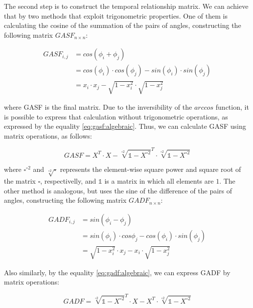 

The second step is to construct the temporal relationship matrix. We can achieve that by two methods that exploit trigonometric properties. One of them is calculating the cosine of the summation of the pairs of angles, constructing the following matrix $GASF_{n \times n}$:

\begin{align}
	GASF_{i,j} 	& = cos(\phi_i + \phi_j) \\
			& = cos(\phi_i) \cdot cos(\phi_j) - sin(\phi_i) \cdot sin(\phi_j) \\
			& = x_i \cdot x_j - \sqrt{1 - x_i^2} \cdot \sqrt{1 - x_j^2} \label{eq:gasf:algebraic}
\end{align}

\noindent where \gls{GASF} is the final matrix. Due to the inversibility of the $arccos$ function, it is possible to express that calculation without trigonometric operations, as expressed by the equality \ref{eq:gasf:algebraic}. Thus, we can calculate \gls{GASF} using matrix operations, as follows:  

\begin{equation}
	GASF = X^T \cdot X - \sqrt[\circ 2]{\mathds{1}-X^{\circ 2}}^T \cdot \sqrt[\circ 2]{\mathds{1}-X^{\circ 2}}
\end{equation}

\noindent where $\square^{\circ 2}$ and $\sqrt[\circ 2]{\square}$ represents the element-wise square power and square root of the matrix $\square$, respectivelly, and $\mathds{1}$ is a matrix in which all elements are $1$. The other method is analogous, but uses the sine of the difference of the pairs of angles, constructing the following matrix $GADF_{n \times n}$:

\begin{align}
	GADF_{i,j} & = sin(\phi_i - \phi_j) \\
		& = sin(\phi_i) \cdot cos{\phi_j} - cos(\phi_i) \cdot sin(\phi_j) \\
		& = \sqrt{1 - x_i^2} \cdot x_j - x_i \cdot \sqrt{1 - x_j^2}  \label{eq:gadf:algebraic}
\end{align}

\noindent Also similarly, by the equality \ref{eq:gadf:algebraic}, we can express \gls{GADF} by matrix operations:

\begin{equation}
	GADF = \sqrt[\circ 2]{\mathds{1} - X^{\circ 2}}^T \cdot X - X^T \cdot \sqrt[\circ 2]{\mathds{1} - X^{\circ 2}}
\end{equation}

